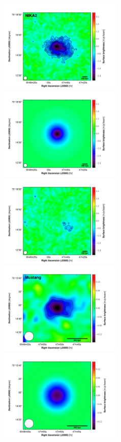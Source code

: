 \documentclass[traditabstract]{aa}
\begin{document}
\begin{figure}[h!]
\centering
\includegraphics[height=4.4cm]{Paper_NIKA2_Data.pdf}
\includegraphics[height=4.4cm]{Paper_NIKA2_Model.pdf}
\includegraphics[height=4.4cm]{Paper_NIKA2_Residual.pdf}
\includegraphics[height=4.4cm]{Paper_Mustang_Data.pdf}
\includegraphics[height=4.4cm]{Paper_Mustang_Model.pdf}

\end{figure}
\end{document}
